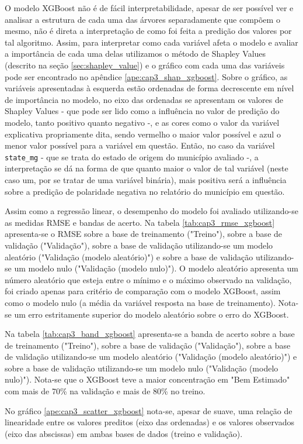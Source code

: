 O modelo XGBoost não é de fácil interpretabilidade, apesar de ser possível ver e analisar a estrutura de cada uma das árvores separadamente que compõem o mesmo, não é direta a interpretação de como foi feita a predição dos valores por tal algoritmo. Assim, para interpretar como cada variável afeta o modelo e avaliar a importância de cada uma delas utilizamos o método de Shapley Values (descrito na seção \ref{sec:shapley_value}) e o gráfico com cada uma das variáveis pode ser encontrado no apêndice \ref{ape:cap3_shap_xgboost}. Sobre o gráfico, as variáveis apresentadas à esquerda estão ordenadas de forma decrescente em nível de importância no modelo, no eixo das ordenadas se apresentam os valores de Shapley Values - que pode ser lido como a influência no valor de predição do modelo, tanto positivo quanto negativo -, e as cores como o valor da variável explicativa propriamente dita, sendo vermelho o maior valor possível e azul o menor valor possível para a variável em questão. Então, no caso da variável \verb|state_mg| - que se trata do estado de origem do município avaliado -, a interpretação se dá na forma de que quanto maior o valor de tal variável (neste caso um, por se tratar de uma variável binária), mais positiva será a influência sobre a predição de polaridade negativa no relatório do município em questão.

Assim como a regressão linear, o desempenho do modelo foi avaliado utilizando-se as medidas RMSE e bandas de acerto. Na tabela \ref{tab:cap3_rmse_xgboost} apresenta-se o RMSE sobre a base de treinamento ("Treino"), sobre a base de validação ("Validação"), sobre a base de validação utilizando-se um modelo aleatório ("Validação (modelo aleatório)") e sobre a base de validação utilizando-se um modelo nulo ("Validação (modelo nulo)"). O modelo aleatório apresenta um número aleatório que esteja entre o mínimo e o máximo observado na validação, foi criado apenas para critério de comparação com o modelo XGBoost, assim como o modelo nulo (a média da variável resposta na base de treinamento). Nota-se um erro estritamente superior do modelo aleatório sobre o erro do XGBoost.

Na tabela \ref{tab:cap3_band_xgboost} apresenta-se a banda de acerto sobre a base de treinamento ("Treino"), sobre a base de validação ("Validação"), sobre a base de validação utilizando-se um modelo aleatório ("Validação (modelo aleatório)") e sobre a base de validação utilizando-se um modelo nulo ("Validação (modelo nulo)"). Nota-se que o XGBoost teve a maior concentração em "Bem Estimado" com mais de 70\% na validação e mais de 80\% no treino.

No gráfico \ref{ape:cap3_scatter_xgboost} nota-se, apesar de suave, uma relação de linearidade entre os valores preditos (eixo das ordenadas) e os valores observados (eixo das abscissas) em ambas bases de dados (treino e validação).

